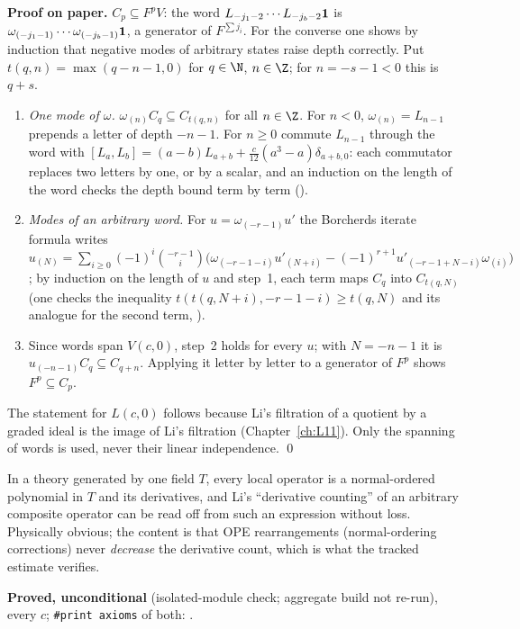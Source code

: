 \textbf{Proof on paper.} $C_p\subseteq F^pV$: the word $L_{-j_1-2}\cdots L_{-j_b-2}\mathbf{1}$ is
$\omega_{(-j_1-1)}\cdots\omega_{(-j_b-1)}\mathbf{1}$, a generator of $F^{\sum j_i}$. For the converse one shows by
induction that negative modes of arbitrary states raise depth correctly. Put $t(q,n)=\max(q-n-1,0)$ for $q\in\N$,
$n\in\Z$; for $n=-s-1<0$ this is $q+s$.
\begin{enumerate}
\item \emph{One mode of $\omega$.} $\omega_{(n)}C_q\subseteq C_{t(q,n)}$ for all $n\in\Z$. For $n<0$, $\omega_{(n)}=L_{n-1}$
  prepends a letter of depth $-n-1$. For $n\ge0$ commute $L_{n-1}$ through the word with $[L_a,L_b]=(a-b)L_{a+b}+
  \frac{c}{12}(a^3-a)\delta_{a+b,0}$: each commutator replaces two letters by one, or by a scalar, and an induction on the
  length of the word checks the depth bound term by term ().
\item \emph{Modes of an arbitrary word.} For $u=\omega_{(-r-1)}u'$ the Borcherds iterate formula writes
  $u_{(N)}=\sum_{i\ge0}(-1)^i\binom{-r-1}{i}\bigl(\omega_{(-r-1-i)}u'_{(N+i)}-(-1)^{r+1}u'_{(-r-1+N-i)}\omega_{(i)}\bigr)$; by
  induction on the length of $u$ and step~1, each term maps $C_q$ into $C_{t(q,N)}$ (one checks the inequality
  $t(t(q,N+i),-r-1-i)\ge t(q,N)$ and its analogue for the second term, ).
\item Since words span $V(c,0)$, step~2 holds for every $u$; with $N=-n-1$ it is
  $u_{(-n-1)}C_q\subseteq C_{q+n}$. Applying it letter by letter to a generator of $F^p$ shows $F^p\subseteq C_p$.
\end{enumerate}
The statement for $L(c,0)$ follows because Li's filtration of a quotient by a graded ideal is the image of Li's
filtration (Chapter~\ref{ch:L11}). Only the spanning of words is used, never their linear independence. \qed

\begin{physics}
In a theory generated by one field $T$, every local operator is a normal-ordered polynomial in $T$ and its
derivatives, and Li's ``derivative counting'' of an arbitrary composite operator can be read off from such an
expression without loss. Physically obvious; the content is that OPE rearrangements (normal-ordering corrections) never
\emph{decrease} the derivative count, which is what the tracked estimate verifies.
\end{physics}

\begin{status}
\textbf{Proved, unconditional} (isolated-module check; aggregate build not re-run), every $c$; \texttt{\#print axioms} of both: .
\end{status}

